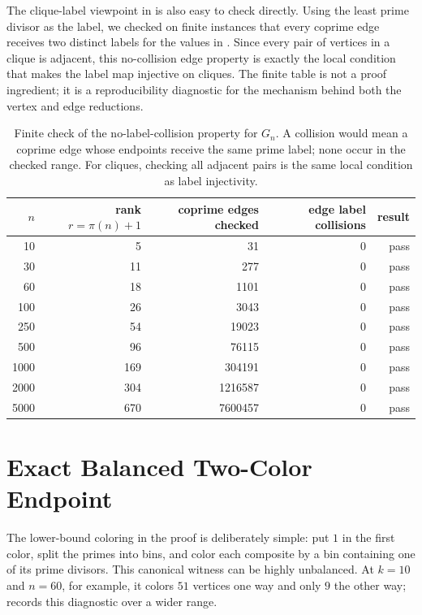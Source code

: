 \documentclass[11pt]{article}
\theoremstyle{plain}
\theoremstyle{definition}
\theoremstyle{remark}
\begin{document}
The clique-label viewpoint in  is also easy to
check directly.  Using the least prime divisor as the label, we checked on
finite instances that every coprime edge receives two distinct labels for the values in
.  Since every pair of vertices in a clique is
adjacent, this no-collision edge property is exactly the local condition that
makes the label map injective on cliques.  The finite table is not a proof
ingredient; it is a reproducibility diagnostic for the mechanism behind both
the vertex and edge reductions.

\begin{table}[htbp]
\centering
\caption{Finite check of the no-label-collision property for $G_n$.  A collision
would mean a coprime edge whose endpoints receive the same prime label; none
occur in the checked range.  For cliques, checking all adjacent pairs is the
same local condition as label injectivity.}
\label{tab:clique-label-check}
\small
\begin{tabular}{@{}rrrrr@{}}
\toprule
$n$ & rank $r=\pi(n)+1$ & coprime edges checked & edge label collisions & result \\
\midrule
10 & 5 & 31 & 0 & pass \\
30 & 11 & 277 & 0 & pass \\
60 & 18 & 1101 & 0 & pass \\
100 & 26 & 3043 & 0 & pass \\
250 & 54 & 19023 & 0 & pass \\
500 & 96 & 76115 & 0 & pass \\
1000 & 169 & 304191 & 0 & pass \\
2000 & 304 & 1216587 & 0 & pass \\
5000 & 670 & 7600457 & 0 & pass \\
\bottomrule
\end{tabular}

\end{table}

\section{Exact Balanced Two-Color Endpoint}
\label{sec:balanced}

The lower-bound coloring in the proof is deliberately simple: put $1$ in the
first color, split the primes into bins, and color each composite by a bin
containing one of its prime divisors.  This canonical witness can be highly
unbalanced.  At $k=10$ and $n=60$, for example, it colors $51$ vertices one
way and only $9$ the other way;  records this
diagnostic over a wider range.
\end{document}
